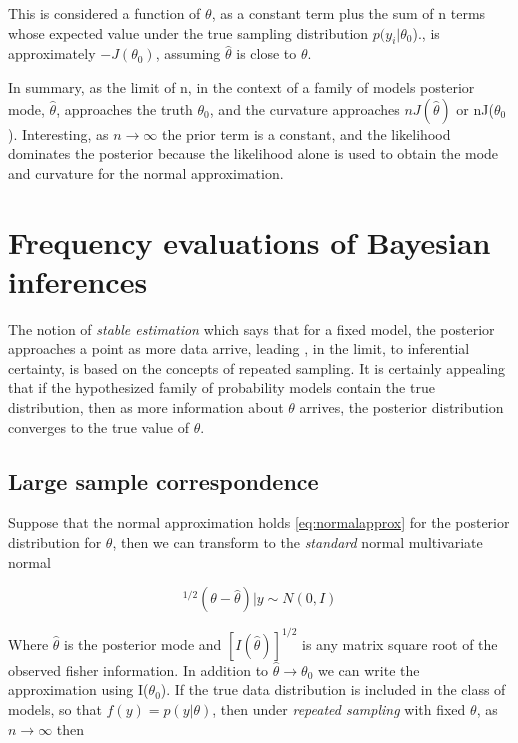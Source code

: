 \documentclass[
]{book}
\theoremstyle{definition}
\theoremstyle{definition}
\theoremstyle{definition}
\theoremstyle{definition}
\theoremstyle{remark}
\begin{document}
This is considered a function of \(\theta\), as a constant term plus the sum of n terms whose expected value under the true sampling distribution \(p(y_i|\theta_0\))., is approximately \(-J(\theta_0)\), assuming \(\hat{\theta}\) is close to \(\theta\).

In summary, as the limit of n, in the context of a family of models posterior mode, \(\hat{\theta}\), approaches the truth \(\theta_0\), and the curvature approaches \(nJ(\hat{\theta})\) or nJ(\(\theta_0\)). Interesting, as \(n\to\infty\) the prior term is a constant, and the likelihood dominates the posterior because the likelihood alone is used to obtain the mode and curvature for the normal approximation.

\hypertarget{frequency-evaluations-of-bayesian-inferences}{%
\section{Frequency evaluations of Bayesian inferences}\label{frequency-evaluations-of-bayesian-inferences}}

The notion of \emph{stable estimation} which says that for a fixed model, the posterior approaches a point as more data arrive, leading , in the limit, to inferential certainty, is based on the concepts of repeated sampling. It is certainly appealing that if the hypothesized family of probability models contain the true distribution, then as more information about \(\theta\) arrives, the posterior distribution converges to the true value of \(\theta\).

\hypertarget{large-sample-correspondence}{%
\subsection*{Large sample correspondence}\label{large-sample-correspondence}}

Suppose that the normal approximation holds \eqref{eq:normalapprox} for the posterior distribution for \(\theta\), then we can transform to the \emph{standard} normal multivariate normal

\begin{equation}
[I(\hat{\theta})]^{1/2}(\theta-\hat{\theta}) |y \sim N(0,I)
\label{eq:standardmultivariateapprox}
\end{equation}

Where \(\hat{\theta}\) is the posterior mode and \([I(\hat{\theta})]^{1/2}\) is any matrix square root of the observed fisher information. In addition to \(\hat{\theta}\to \theta_0\) we can write the approximation using I(\(\theta_0\)). If the true data distribution is included in the class of models, so that \(f(y)= p(y|\theta)\), then under \emph{repeated sampling} with fixed \(\theta\), as \(n \to \infty\) then
\end{document}
